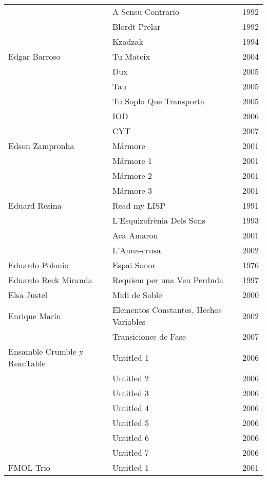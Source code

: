 \begin{center}
\begin{longtable}{ p{}  p{}  p{} }
& A Sensu Contrario & 1992 \\ \cmidrule (r){2-3} 
& Blordt Prelar & 1992 \\ \cmidrule (r){2-3} 
& Kzadzak & 1994 \\ \midrule 
Edgar Barroso & Tu Mateix & 2004 \\ \cmidrule (r){2-3} 
& Dux & 2005 \\ \cmidrule (r){2-3} 
& Tau & 2005 \\ \cmidrule (r){2-3} 
& Tu Soplo Que Transporta & 2005 \\ \cmidrule (r){2-3} 
& IOD & 2006 \\ \cmidrule (r){2-3} 
& CYT & 2007 \\ \midrule 
Edson Zampronha & Mármore & 2001 \\ \cmidrule (r){2-3} 
& Mármore 1 & 2001 \\ \cmidrule (r){2-3} 
& Mármore 2 & 2001 \\ \cmidrule (r){2-3} 
& Mármore 3 & 2001 \\ \midrule 
Eduard Resina & Read my LISP & 1991 \\ \cmidrule (r){2-3} 
& L'Esquizofrènia Dels Sons & 1993 \\ \cmidrule (r){2-3} 
& Aca Amaron & 2001 \\ \cmidrule (r){2-3} 
& L'Anna-crusa & 2002 \\ \midrule 
Eduardo Polonio & Espai Sonor & 1976 \\ \midrule 
Eduardo Reck Miranda & Requiem per una Veu Perduda & 1997 \\ \midrule 
Elsa Justel & Midi de Sable & 2000 \\ \midrule 
Enrique Marín & Elementos Constantes, Hechos Variables & 2002 \\ \cmidrule (r){2-3} 
& Transiciones de Fase & 2007 \\ \midrule 
Ensamble Crumble y ReacTable & Untitled 1 & 2006 \\ \cmidrule (r){2-3} 
& Untitled 2 & 2006 \\ \cmidrule (r){2-3} 
& Untitled 3 & 2006 \\ \cmidrule (r){2-3} 
& Untitled 4 & 2006 \\ \cmidrule (r){2-3} 
& Untitled 5 & 2006 \\ \cmidrule (r){2-3} 
& Untitled 6 & 2006 \\ \cmidrule (r){2-3} 
& Untitled 7 & 2006 \\ \midrule 
FMOL Trio & Untitled 1 & 2001 \\ \cmidrule (r){2-3} 

\end{longtable}
\end{center}
